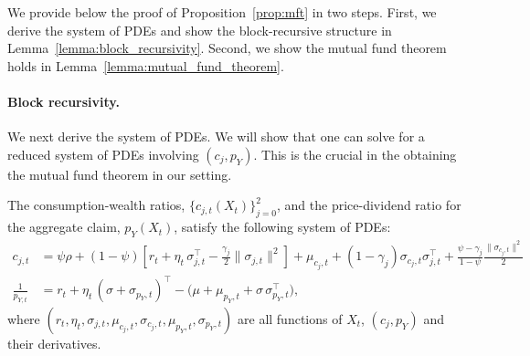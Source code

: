 We provide below the proof of Proposition~\ref{prop:mft} in two steps. 
First, we derive the system of PDEs and show the block-recursive structure in Lemma~\ref{lemma:block_recursivity}.
Second, we show the mutual fund theorem holds in Lemma~\ref{lemma:mutual_fund_theorem}.

\paragraph{Block recursivity.}
We next derive the system of PDEs. 
We will show that one can solve for a reduced system of PDEs involving $(c_j,p_Y)$.
This is the crucial in the obtaining the mutual fund theorem in our setting.

\begin{lemma}\label{lemma:block_recursivity}
    The consumption-wealth ratios, $\{c_{j,t}(X_t)\}_{j=0}^2$, and the price-dividend ratio for the aggregate claim, $p_Y(X_t)$, satisfy the following system of PDEs:
    \begin{align}
        c_{j,t} &= \psi \rho 
        + (1-\psi) \left[ r_t + \eta_{t}\,\sigma_{j,t}^\top - \frac{\gamma_j}{2} \|\sigma_{j,t}\|^2 \right] 
        +  \mu_{c_j,t} 
        + (1-\gamma_j) \sigma_{c_j,t} \sigma_{j,t}^\top 
        + \frac{\psi - \gamma_j}{1-\psi} \frac{\|\sigma_{c_j,t}\|^2}{2}\\
        \frac{1}{p_{Y,t}} &= r_t + \eta_{t}\,(\sigma + \sigma_{p_Y,t})^\top - \big(\mu + \mu_{p_Y,t} + \sigma \, \sigma_{p_Y,t}^\top\big),        
\end{align}
where $(r_t, \eta_t, \sigma_{j,t}, \mu_{c_j,t}, \sigma_{c_j,t}, \mu_{p_Y,t}, \sigma_{p_Y,t})$ are all functions of $X_t$, $(c_j,p_Y)$ and their derivatives.    
\end{lemma}

